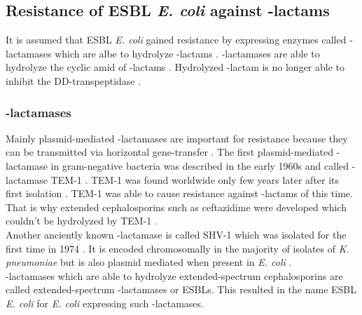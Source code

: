 \subsection{Resistance of ESBL \textit{E. coli} against \textbeta-lactams}
\label{section:resistance_mechanisms}
It is assumed that ESBL \textit{E. coli} gained resistance by expressing enzymes called \textbeta-lactamases which are albe to hydrolyze \textbeta-lactams \cite{fisher_bacterial_2005}.
\textbeta-lactamases are able to hydrolyze the cyclic amid of \textbeta-lactams \cite{noauthor_beta-lactam_nodate}. Hydrolyzed \textbeta-lactam is no longer able to inhibit the DD-transpeptidase \cite{noauthor_beta-lactam_nodate}.

\subsubsection{\textbeta-lactamases}
Mainly plasmid-mediated \textbeta-lactamases are important for resistance because they can be transmitted via horizontal gene-transfer \cite{munita_mechanisms_2016}.  
The first plasmid-mediated \textbeta-lactamase in gram-negative bacteria was described in the early 1960s and called \textbeta-lactamase TEM-1 \cite{fernandes_-lactams:_2013}. TEM-1 was found worldwide only few years later after its first isolation \cite{fernandes_-lactams:_2013}. TEM-1 was able to cause resistance against \textbeta-lactams of this time.  That is why extended cephalosporins such as ceftazidime were developed which couldn't be hydrolyzed by TEM-1 \cite{fernandes_-lactams:_2013}. \\
Another anciently known \textbeta-lactamase is called SHV-1 which was isolated for the first time in 1974 \cite{kuzin_structure_1999}. It is encoded chromosomally in the majority of isolates of \textit{K. pneumoniae} but is also plasmid mediated when present in \textit{E. coli} \cite{kuzin_structure_1999}. \\
\textbeta-lactamases which are able to hydrolyze extended-spectrum cephalosporins are called extended-spectrum \textbeta-lactamases or ESBLs. This resulted in the name ESBL \textit{E. coli} for  \textit{E. coli} expressing such \textbeta-lactamases. 

